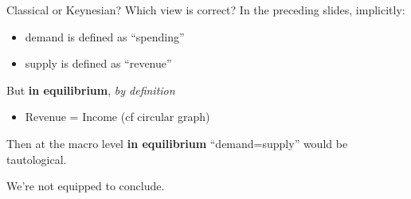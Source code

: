 \begin{frame}{Classical or Keynesian? Which view is correct?}
\protect\hypertarget{classical-or-keynesian-which-view-is-correct}{}
In the preceding slides, implicitly:

\begin{itemize}
\tightlist
\item
  demand is defined as ``spending''
\item
  supply is defined as ``revenue''
\end{itemize}

But \textbf{in equilibrium}, \emph{by definition}

\begin{itemize}
\tightlist
\item
  Revenue = Income (cf circular graph)
\end{itemize}

Then at the macro level \textbf{in equilibrium} ``demand=supply'' would
be tautological.

We're not equipped to conclude.
\end{frame}

